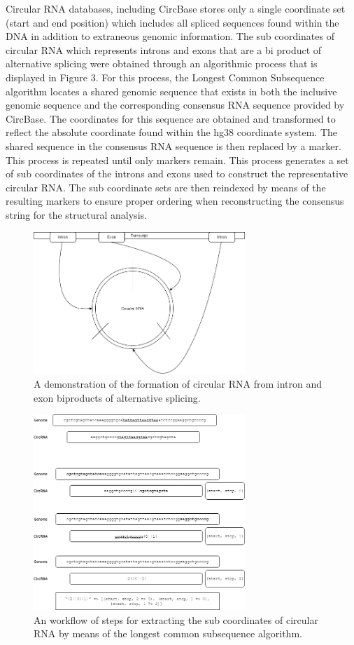 \documentclass[11pt]{article}
\begin{document}
Circular RNA databases, including CircBase stores only a single coordinate set (start and end position) which includes all spliced sequences found within the DNA in addition to extraneous genomic information. The sub coordinates of circular RNA which represents introns and exons that are a bi product of alternative splicing were obtained through an algorithmic process that is displayed in Figure 3. For this process, the Longest Common Subsequence algorithm locates a shared genomic sequence that exists in both the inclusive genomic sequence and the corresponding consensus RNA sequence provided by CircBase. The coordinates for this sequence are obtained and transformed to reflect the absolute coordinate found within the hg38 coordinate system. The shared sequence in the consensus RNA sequence is then replaced by a marker. This process is repeated until only markers remain. This process generates a set of sub coordinates of the introns and exons used to construct the representative circular RNA. The sub coordinate sets are then reindexed by means of the resulting markers to ensure proper ordering when reconstructing the consensus string for the structural analysis. 

\begin{figure}[t]
	\centering
	\includegraphics[width=8cm]{circ-rna}
	\caption{A demonstration of the formation of circular RNA from intron and exon biproducts of alternative splicing.
	}
	\label{fig:mesh1}
\end{figure}

\begin{figure}[t]
	\centering
	\includegraphics[width=8cm]{circrna-algorithm}
	\caption{An workflow of steps for extracting the sub coordinates of circular RNA by means of the longest common subsequence algorithm.}
	\label{fig:mesh1}
\end{figure}
\end{document}
